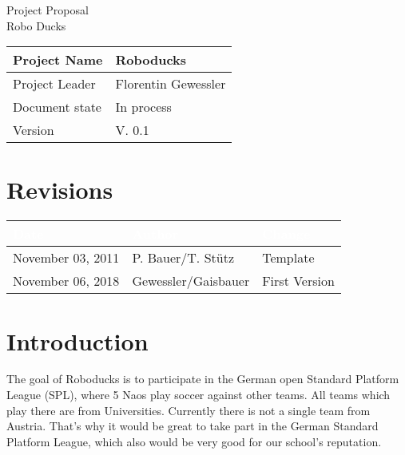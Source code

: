 \documentclass[12pt]{article}
\theoremstyle{definition}
\newcommand{\projectname}{Roboducks}
\newcommand{\productname}{Robo Ducks}
\newcommand{\projectleader}{Florentin Gewessler}
\newcommand{\documentstatus}{In process}
\newcommand{\version}{V. 0.1}
\begin{document}
\begin{titlepage}
\begin{flushright}

\end{flushright}

\vspace{10em}

\begin{center}
{\Huge Project Proposal} \\[3em]
{\LARGE \productname} \\[3em]
\end{center}

\begin{flushleft}
\begin{tabular}{|l|l|}
\hline
Project Name & \projectname \\ \hline
Project Leader & \projectleader \\ \hline
Document state & \documentstatus \\ \hline
Version & \version \\ \hline
\end{tabular}
\end{flushleft}

\end{titlepage}
\section*{Revisions}
\begin{tabular}{|l|l|l|}
\hline
\cellcolor[gray]{0.5}\textcolor{white}{Date} & \cellcolor[gray]{0.5}\textcolor{white}{Author} & \cellcolor[gray]{0.5}\textcolor{white}{Change} \\ \hline
November 03, 2011&P. Bauer/T. Stütz&Template \\ \hline
November 06, 2018&Gewessler/Gaisbauer&First Version\\ \hline
\end{tabular}
\pagebreak

\tableofcontents
\pagebreak

\section{Introduction}

The goal of Roboducks is to participate in the German open Standard Platform League (SPL), where 5 Naos play soccer against other teams. All teams which play there are from Universities. Currently there is not a single team from Austria. That's why it would be great to take part in the German Standard Platform League, which also would be very good for our school's reputation.\\
\end{document}
